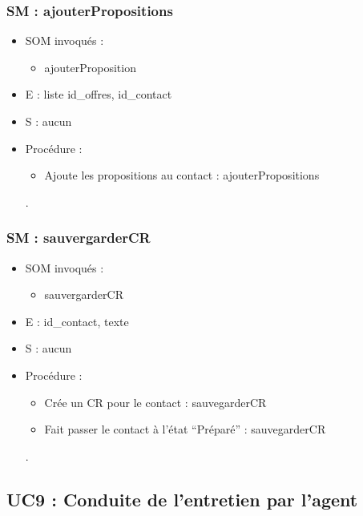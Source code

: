 \subsubsection{SM : ajouterPropositions}
\begin{itemize}
	\item SOM invoqués :
	\begin{itemize}
		\item ajouterProposition
	\end{itemize}
	\item E : liste id\_offres, id\_contact
	\item S : aucun
	\item Procédure :
	\begin{itemize}
		\item Ajoute les propositions au contact : ajouterPropositions
	\end{itemize}.
\end{itemize}

\subsubsection{SM : sauvergarderCR}
\begin{itemize}
	\item SOM invoqués :
	\begin{itemize}
		\item sauvergarderCR
	\end{itemize}
	\item E : id\_contact, texte
	\item S : aucun
	\item Procédure :
	\begin{itemize}
		\item Crée un CR pour le contact : sauvegarderCR
		\item Fait passer le contact à l’état “Préparé” : sauvegarderCR
	\end{itemize}.
\end{itemize}



\subsection{UC9 : Conduite de l’entretien par l’agent}

